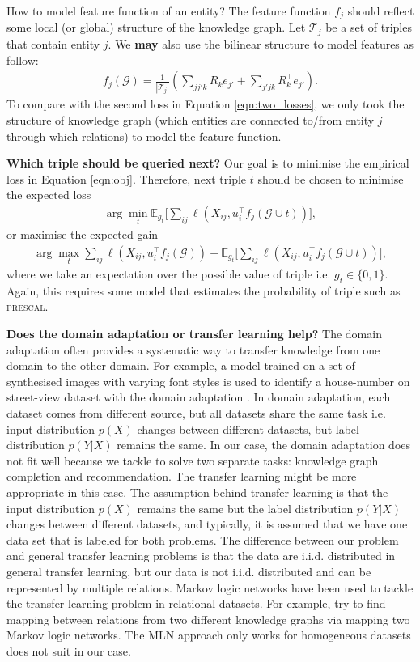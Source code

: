 \documentclass{article} %
\theoremstyle{definition}
\begin{document}
How to model feature function of an entity? The feature function $f_j$ should reflect some local (or global) structure of the knowledge graph.  Let $\mathcal{T}_j$ be a set of triples that contain entity $j$. We \textbf{may} also use the bilinear structure to model features as follow:
\begin{align}
f_j(\mathcal{G}) = \frac{1}{|\mathcal{T}_j|} ( \sum_{jj'k} R_k e_{j'} + \sum_{j'jk}R_k^\top e_{j'} ).
\end{align}
To compare with the second loss in Equation \ref{eqn:two_losses}, we only took the structure of knowledge graph (which entities are connected to/from entity $j$ through which relations) to model the feature function.

\textbf{Which triple should be queried next?} Our goal is to minimise the empirical loss in Equation \ref{eqn:obj}. Therefore, next triple $t$ should be chosen to minimise the expected loss
\begin{align}
\arg\min_t \mathbb{E}_{g_t}\bigg[\sum_{ij}\ell(X_{ij}, u_{i}^\top  f_j(\mathcal{G} \cup t))\bigg],
\end{align}
or maximise the expected gain
\begin{align}
\arg\max_t \sum_{ij}\ell(X_{ij}, u_{i}^\top  f_j(\mathcal{G})) - \mathbb{E}_{g_t}\bigg[\sum_{ij}\ell(X_{ij}, u_{i}^\top  f_j(\mathcal{G} \cup t))\bigg],
\end{align}
where we take an expectation over the possible value of triple i.e. $g_t \in \{0, 1\}$. Again, this requires some model that estimates the probability of triple such as \textsc{prescal}.

\textbf{Does the domain adaptation or transfer learning help?} The domain adaptation often provides a systematic way to transfer knowledge from one domain to the other domain. For example, a model trained on a set of synthesised images with varying font styles is used to identify a house-number on street-view dataset with the domain adaptation \cite{Ganin2015}. In domain adaptation, each dataset comes from different source, but all datasets share the same task i.e. input distribution $p(X)$ changes between different datasets, but label distribution $p(Y|X)$ remains the same. In our case, the domain adaptation does not fit well because we tackle to solve two separate tasks: knowledge graph completion and recommendation. The transfer learning might be more appropriate in this case. The assumption behind transfer learning is that the input distribution $p(X)$ remains the same but the label distribution $p(Y|X)$ changes between different datasets, and typically, it is assumed that we have one data set that is labeled for both problems. The difference between our problem and general transfer learning problems is that the data are i.i.d. distributed in general transfer learning, but our data is not i.i.d. distributed and can be represented by multiple relations. Markov logic networks have been used to tackle the transfer learning problem in relational datasets. For example, \cite{Mihalkova2007} try to find mapping between relations from two different knowledge graphs via mapping two Markov logic networks. The MLN approach only works for homogeneous datasets does not suit in our case.




\end{document}
